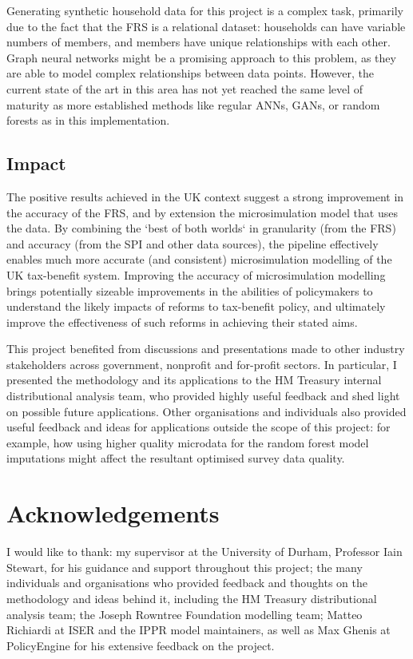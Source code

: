 \documentclass{article}
\begin{document}
Generating synthetic household data for this project is a complex task, primarily due to the fact that the FRS is a relational dataset: households can have variable numbers of members, and members have unique relationships with each other. Graph neural networks might be a promising approach to this problem, as they are able to model complex relationships between data points. However, the current state of the art in this area has not yet reached the same level of maturity as more established methods like regular ANNs, GANs, or random forests as in this implementation.



\subsection{Impact}

The positive results achieved in the UK context suggest a strong improvement in the accuracy of the FRS, and by extension the microsimulation model that uses the data. By combining the `best of both worlds` in granularity (from the FRS) and accuracy (from the SPI and other data sources), the pipeline effectively enables much more accurate (and consistent) microsimulation modelling of the UK tax-benefit system. Improving the accuracy of microsimulation modelling brings potentially sizeable improvements in the abilities of policymakers to understand the likely impacts of reforms to tax-benefit policy, and ultimately improve the effectiveness of such reforms in achieving their stated aims.

This project benefited from discussions and presentations made to other industry stakeholders across government, nonprofit and for-profit sectors. In particular, I presented the methodology and its applications to the HM Treasury internal distributional analysis team, who provided highly useful feedback and shed light on possible future applications. Other organisations and individuals also provided useful feedback and ideas for applications outside the scope of this project: for example, how using higher quality microdata for the random forest model imputations might affect the resultant optimised survey data quality.

\section*{Acknowledgements}

I would like to thank: my supervisor at the University of Durham, Professor Iain Stewart, for his guidance and support throughout this project; the many individuals and organisations who provided feedback and thoughts on the methodology and ideas behind it, including the HM Treasury distributional analysis team; the Joseph Rowntree Foundation modelling team; Matteo Richiardi at ISER and the IPPR model maintainers, as well as Max Ghenis at PolicyEngine for his extensive feedback on the project.
\end{document}
